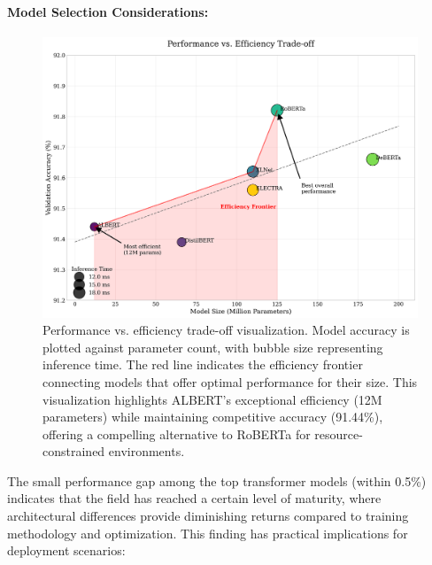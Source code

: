 \documentclass[12pt]{article}
\begin{document}
\paragraph{Model Selection Considerations:}
\begin{figure}[h]
    \centering
    \includegraphics[width=0.9\linewidth]{Figures_Improved/performance_efficiency_tradeoff_improved.png}
    \caption{Performance vs. efficiency trade-off visualization. Model accuracy is plotted against parameter count, with bubble size representing inference time. The red line indicates the efficiency frontier connecting models that offer optimal performance for their size. This visualization highlights ALBERT's exceptional efficiency (12M parameters) while maintaining competitive accuracy (91.44\%), offering a compelling alternative to RoBERTa for resource-constrained environments.}
    \label{fig:efficiency_tradeoff}
\end{figure}

The small performance gap among the top transformer models (within 0.5\%) indicates that the field has reached a certain level of maturity, where architectural differences provide diminishing returns compared to training methodology and optimization. This finding has practical implications for deployment scenarios:
\end{document}
